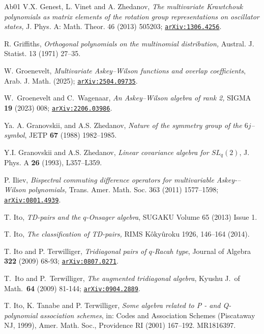 \documentclass[11pt]{amsart}
\numberwithin{equation}{section}
\numberwithin{equation}{section}
\begin{document}
\begin{thebibliography}{Ab01}
V.X. Genest, L. Vinet and A. Zhedanov, 
{\it The multivariate Krawtchouk polynomials as matrix
elements of the rotation group representations on oscillator states,} 
J. Phys. A: Math. Theor. 46
(2013) 505203; \href{https://arxiv.org/abs/1306.4256}{\texttt{arXiv:1306.4256}}.

R. Griffiths,
  {\it Orthogonal polynomials on the multinomial distribution,} 
  Austral. J. Statist. 13 (1971) 27–35.


 W. Groenevelt, 
\textit{Multivariate Askey--Wilson functions and overlap coefficients},
Arab. J. Math. (2025); \href{https://arxiv.org/abs/2504.09735}{\tt arXiv:2504.09735}.

 W.~Groenevelt and C.~Wagenaar, {\it An Askey--Wilson algebra of rank 2,} 
SIGMA {\bf 19} (2023) 008; \href{https://arxiv.org/abs/2206.03986}{\texttt{arXiv:2206.03986}}.

Ya. A. Granovskii, and A.S. Zhedanov, {\it Nature of the symmetry group of the $6j$--symbol}, JETP {\bf 67} (1988) 1982--1985.

 Y.I. Granovskii and A.S. Zhedanov, {\it Linear covariance algebra for $SL_q(2)$}, J. Phys. A {\bf 26} (1993), L357–L359.

 P. Iliev, 
 {\it Bispectral commuting difference operators for multivariable Askey-–Wilson polynomials,}
Trans. Amer. Math. Soc. 363 (2011) 1577–1598; \href{https://arxiv.org/abs/0801.4939}{\texttt{arXiv:0801.4939}}.


 T. Ito, 
\textit{TD-pairs and the $q$-Onsager algebra}, 
SUGAKU Volume 65 (2013) Issue 1.

 T. Ito, 
\textit{The classification of TD-pairs,} 
RIMS Kôkyûroku 1926, 146–164 (2014).

T. Ito and P. Terwilliger, {\it Tridiagonal pairs of $q$-Racah type}, Journal of Algebra {\bf 322} (2009) 68-93; \href{https://arxiv.org/abs/0807.0271}{\texttt{arXiv:0807.0271}}.

T.\ Ito and P.\ Terwilliger,  \textit{The augmented tridiagonal algebra}, Kyushu J.\ of Math.\ {\bf 64} (2009) 81-144; \href{https://arxiv.org/abs/0904.2889}{\tt arXiv:0904.2889}.

T. Ito, K. Tanabe and P. Terwilliger, {\it Some algebra related to P - and Q-polynomial association schemes}, in: Codes and Association Schemes (Piscataway NJ, 1999), Amer. Math. Soc.,
Providence RI (2001) 167–192. MR1816397.


\end{thebibliography}
\end{document}
